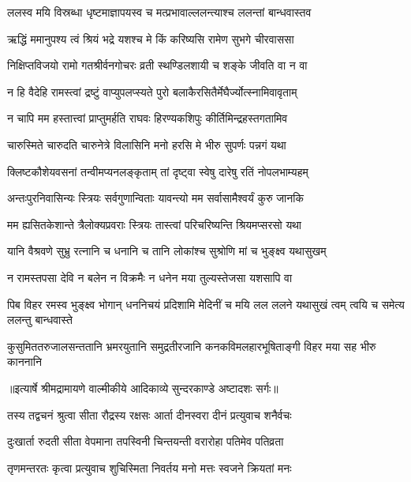 \twolineshloka
{ललस्व मयि विस्रब्धा धृष्टमाज्ञापयस्व च}
{मत्प्रभावाल्ललन्त्याश्च ललन्तां बान्धवास्तव} %

\twolineshloka
{ऋद्धिं ममानुपश्य त्वं श्रियं भद्रे यशश्च मे}
{किं करिष्यसि रामेण सुभगे चीरवाससा} %

\twolineshloka
{निक्षिप्तविजयो रामो गतश्रीर्वनगोचरः}
{व्रती स्थण्डिलशायी च शङ्के जीवति वा न वा} %

\twolineshloka
{न हि वैदेहि रामस्त्वां द्रष्टुं वाप्युपलप्स्यते}
{पुरो बलाकैरसितैर्मेघैर्ज्योत्स्नामिवावृताम्} %

\twolineshloka
{न चापि मम हस्तात्त्वां प्राप्तुमर्हति राघवः}
{हिरण्यकशिपुः कीर्तिमिन्द्रहस्तगतामिव} %

\twolineshloka
{चारुस्मिते चारुदति चारुनेत्रे विलासिनि}
{मनो हरसि मे भीरु सुपर्णः पन्नगं यथा} %

\twolineshloka
{क्लिष्टकौशेयवसनां तन्वीमप्यनलङ्कृताम्}
{तां दृष्ट्वा स्वेषु दारेषु रतिं नोपलभाम्यहम्} %

\twolineshloka
{अन्तःपुरनिवासिन्यः स्त्रियः सर्वगुणान्विताः}
{यावन्त्यो मम सर्वासामैश्वर्यं कुरु जानकि} %

\twolineshloka
{मम ह्यसितकेशान्ते त्रैलोक्यप्रवराः स्त्रियः}
{तास्त्वां परिचरिष्यन्ति श्रियमप्सरसो यथा} %

\twolineshloka
{यानि वैश्रवणे सुभ्रु रत्नानि च धनानि च}
{तानि लोकांश्च सुश्रोणि मां च भुङ्क्ष्व यथासुखम्} %

\twolineshloka
{न रामस्तपसा देवि न बलेन न विक्रमैः}
{न धनेन मया तुल्यस्तेजसा यशसापि वा} %

\fourlineindentedshloka
{पिब विहर रमस्व भुङ्क्ष्व भोगान्}
{धननिचयं प्रदिशामि मेदिनीं च}
{मयि लल ललने यथासुखं त्वम्}
{त्वयि च समेत्य ललन्तु बान्धवास्ते} %

\fourlineindentedshloka
{कुसुमिततरुजालसन्ततानि}
{भ्रमरयुतानि समुद्रतीरजानि}
{कनकविमलहारभूषिताङ्गी}
{विहर मया सह भीरु काननानि} %


{॥इत्यार्षे श्रीमद्रामायणे वाल्मीकीये आदिकाव्ये सुन्दरकाण्डे अष्टादशः सर्गः॥}


\twolineshloka
{तस्य तद्वचनं श्रुत्वा सीता रौद्रस्य रक्षसः}
{आर्ता दीनस्वरा दीनं प्रत्युवाच शनैर्वचः} %

\twolineshloka
{दुःखार्ता रुदती सीता वेपमाना तपस्विनी}
{चिन्तयन्ती वरारोहा पतिमेव पतिव्रता} %

\twolineshloka
{तृणमन्तरतः कृत्वा प्रत्युवाच शुचिस्मिता}
{निवर्तय मनो मत्तः स्वजने क्रियतां मनः} %

